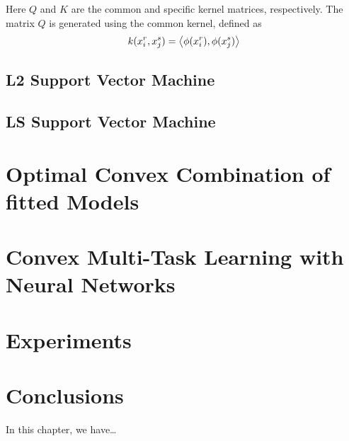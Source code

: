 Here $Q$ and $K$ are the common and specific kernel matrices, respectively.
The matrix $Q$ is generated using the common kernel, defined as 
\begin{equation}
    \nonumber
    k(x_i^r, x_j^s) = \left\langle \phi(x_i^r), \phi(x_j^s) \right\rangle 
\end{equation}


















\subsection{L2 Support Vector Machine}





\subsection{LS Support Vector Machine}






\section{Optimal Convex Combination of fitted Models}



\section{Convex Multi-Task Learning with Neural Networks}

\section{Experiments}

\section{Conclusions}\label{sec-conclusions-3}

In this chapter, we have\dots

